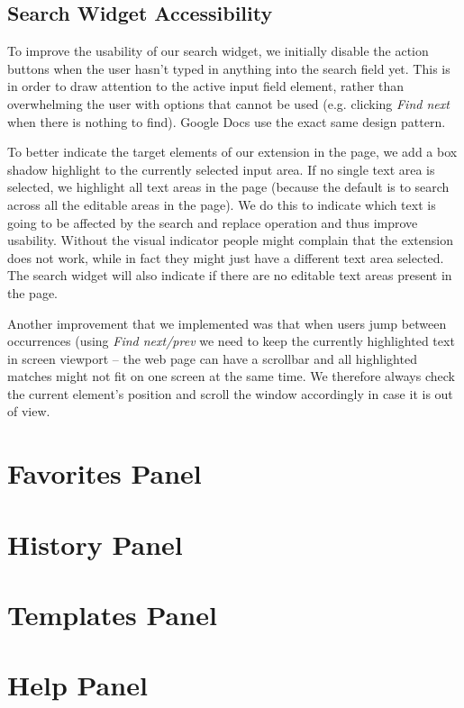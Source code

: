 \documentclass[bsc,frontabs,twoside,singlespacing,parskip,deptreport]{infthesis}
\begin{document}
\subsection{Search Widget Accessibility}
To improve the usability of our search widget, we initially disable the action buttons when the user hasn't typed in anything into the search field yet. This is in order to draw attention to the active input field element, rather than overwhelming the user with options that cannot be used (e.g. clicking \textit{Find next} when there is nothing to find). Google Docs use the exact same design pattern. 

To better indicate the target elements of our extension in the page, we add a box shadow highlight to the currently selected input area. If no single text area is selected, we highlight all text areas in the page (because the default is to search across all the editable areas in the page). We do this to indicate which text is going to be affected by the search and replace operation and thus improve usability. Without the visual indicator people might complain that the extension does not work, while in fact they might just have a different text area selected. The search widget will also indicate if there are no editable text areas present in the page.

Another improvement that we implemented was that when users jump between occurrences (using \textit{Find next/prev} we need to keep the currently highlighted text in screen viewport -- the web page can have a scrollbar and all highlighted matches might not fit on one screen at the same time. We therefore always check the current element's position and scroll the window accordingly in case it is out of view.

\section{Favorites Panel}
\section{History Panel}
\section{Templates Panel}
\section{Help Panel}
\end{document}
